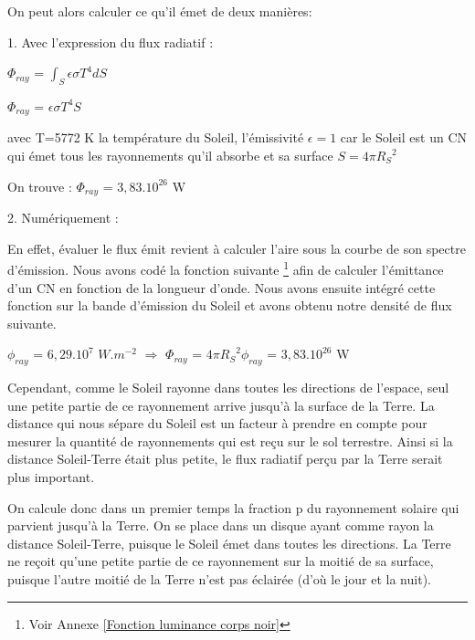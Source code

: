 \documentclass[a4paper, 12pt]{report} %
\newcommand{\annexeref}[1]{Voir Annexe \ref{#1}}
\begin{document}
\noindent On peut alors calculer ce qu'il émet de deux manières: \vspace{\baselineskip}

1. Avec l'expression du flux radiatif :
\begin{center}
$\Phi_{ray}$ = $\int_S \epsilon \sigma T^{4} dS$    
\end{center}
\begin{center}
$\Phi_{ray}$ = $\epsilon \sigma T^{4} S$    
\end{center}
avec T=5772 K la température du Soleil, l'émissivité 
$\epsilon = 1$ car le Soleil est un CN qui émet tous les rayonnements qu'il absorbe 
et sa surface $S=4\pi{R_S}^2$ 
\vspace{\baselineskip}

\noindent On trouve : \vspace{\baselineskip}
$\Phi_{ray}$ = $3,83.10^{26}$ W 

2. Numériquement : \vspace{\baselineskip}

En effet, évaluer le flux émit revient à calculer l'aire sous la courbe de son spectre d'émission.
Nous avons codé la fonction suivante \footnote{ \annexeref{Fonction luminance corps noir}} 
afin de calculer l'émittance d'un CN en fonction de la longueur d'onde. Nous avons ensuite intégré cette fonction sur la bande d'émission du Soleil et avons obtenu notre densité de flux suivante. \vspace{\baselineskip}

$\phi_{ray}$ = $6,29.10^7$ $W.m^{-2}$ 
$\Rightarrow$ $\Phi_{ray}$ = $4\pi{R_S}^2\phi_{ray}$ = $3,83.10^{26}$ W
\vspace{\baselineskip}

Cependant, comme le Soleil rayonne dans toutes les directions de l’espace, seul une petite partie de ce rayonnement arrive jusqu’à la surface de la Terre. 
La distance qui nous sépare du Soleil est un facteur à prendre en compte pour mesurer la quantité de rayonnements qui est reçu sur le sol terrestre. Ainsi   si la distance Soleil-Terre était plus petite, le flux radiatif  perçu par la Terre serait plus important.  \vspace{\baselineskip}

On calcule donc dans un premier temps la fraction p du rayonnement solaire qui parvient jusqu'à la Terre. 
On se place dans un disque ayant comme rayon la distance Soleil-Terre, puisque le Soleil émet dans toutes les directions.
La Terre ne reçoit qu'une petite partie de ce rayonnement sur la moitié de sa surface, puisque l'autre moitié de la Terre n'est pas éclairée (d'où le jour et la nuit). 
\end{document}
